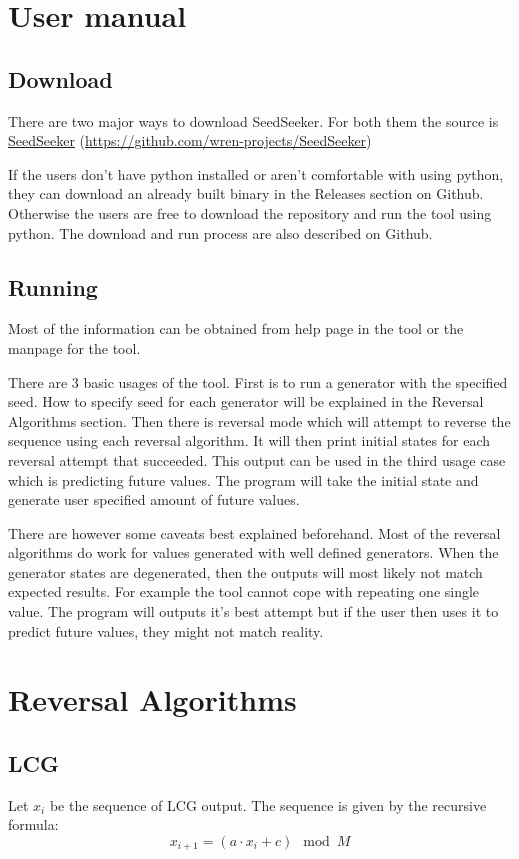 \documentclass[12pt, a4paper]{report}
\begin{document}
\chapter{User manual}
\section{Download}
There are two major ways to download SeedSeeker. For both them the source 
is \href{https://github.com/wren-projects/SeedSeeker}{SeedSeeker} 
(\url{https://github.com/wren-projects/SeedSeeker})

If the users don't have python installed or aren't comfortable with using python, they can download an already built
binary in the Releases section on Github. Otherwise the users are free to download the repository and run the tool
using python. The download and run process are also described on Github.
\section{Running}
Most of the information can be obtained from help page in the tool or the manpage for the tool.

There are 3 basic usages of the tool. First is to run a generator with the specified seed. How to specify seed
for each generator will be explained in the Reversal Algorithms section. Then there is reversal mode which will attempt
to reverse the sequence using each reversal algorithm. It will then print initial states for each reversal 
attempt that succeeded. This output can be used in the third usage case which is predicting future values.
The program will take the initial state and generate user specified amount of future values.

There are however some caveats best explained beforehand. Most of the reversal algorithms do work
for values generated with well defined generators. When the generator states are degenerated, then the outputs will
most likely not match expected results. For example the tool cannot cope with repeating one single value. The program 
will outputs it's best attempt but if the user then uses it to predict future values, they might not match reality.
\chapter{Reversal Algorithms}
\section{LCG}
Let $x_i$ be the sequence of LCG output. The sequence is given by the recursive formula:
$$x_{i+1} = (a \cdot x_i + c) \mod M$$
\end{document}
